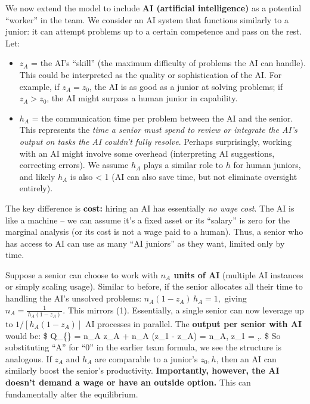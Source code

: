 \documentclass[12pt]{article}
\begin{document}
We now extend the model to include \textbf{AI (artificial intelligence)}
as a potential ``worker'' in the team. We consider an AI system that
functions similarly to a junior: it can attempt problems up to a certain
competence and pass on the rest. Let:

\begin{itemize}
\tightlist
\item
  \(z_A\) = the AI's ``skill'' (the maximum difficulty of problems the
  AI can handle). This could be interpreted as the quality or
  sophistication of the AI. For example, if \(z_A = z_0\), the AI is as
  good as a junior at solving problems; if \(z_A > z_0\), the AI might
  surpass a human junior in capability.
\item
  \(h_A\) = the communication time per problem between the AI and the
  senior. This represents the \emph{time a senior must spend to review
  or integrate the AI's output on tasks the AI couldn't fully resolve}.
  Perhaps surprisingly, working with an AI might involve some overhead
  (interpreting AI suggestions, correcting errors). We assume \(h_A\)
  plays a similar role to \(h\) for human juniors, and likely \(h_A\) is
  also \textless{} 1 (AI can also save time, but not eliminate oversight
  entirely).
\end{itemize}

The key difference is \textbf{cost:} hiring an AI has essentially
\emph{no wage cost}. The AI is like a machine -- we can assume it's a
fixed asset or its ``salary'' is zero for the marginal analysis (or its
cost is not a wage paid to a human). Thus, a senior who has access to AI
can use as many ``AI juniors'' as they want, limited only by time.

Suppose a senior can choose to work with \textbf{\(n_A\) units of AI}
(multiple AI instances or simply scaling usage). Similar to before, if
the senior allocates all their time to handling the AI's unsolved
problems: \(n_A (1 - z_A)\, h_A = 1,\) giving
\(n_A = \frac{1}{\,h_A(1-z_A)\,}.\) This mirrors (1). Essentially, a
single senior can now leverage up to \(1/[h_A(1-z_A)]\) AI processes in
parallel. The \textbf{output per senior with AI} would be: \$
Q\_\{\} = n\_A z\_A + n\_A (z\_1 - z\_A) =
n\_A, z\_1 = ,. \$ So substituting
``A'' for ``0'' in the earlier team formula, we see the structure is
analogous. If \(z_A\) and \(h_A\) are comparable to a junior's
\(z_0, h\), then an AI can similarly boost the senior's productivity.
\textbf{Importantly, however, the AI doesn't demand a wage or have an
outside option.} This can fundamentally alter the equilibrium.
\end{document}
